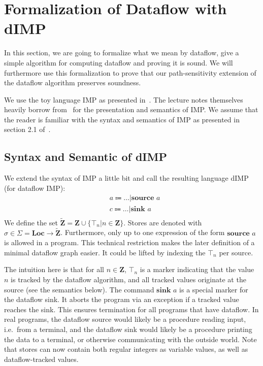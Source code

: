 \section{Formalization of Dataflow with dIMP}

In this section, we are going to formalize what we mean by dataflow,
give a simple algorithm for computing dataflow and proving it is sound.
We will furthermore use this formalization to prove that our
path-sensitivity extension of the dataflow algorithm preserves soundness.

We use the toy language IMP as presented in~\cite{sat}.
The lecture notes themselves heavily borrow from~\cite{fsopl} for the
presentation and semantics of IMP.
We assume that the reader is familiar with the syntax and semantics of IMP
as presented in section 2.1 of~\cite{sat}.

\subsection{Syntax and Semantic of dIMP}
We extend the syntax of IMP a little bit
and call the resulting language dIMP (for dataflow IMP):
\begin{align*}
    &a \Coloneqq \dots | \textbf{source } a\\
    &c \Coloneqq \dots | \textbf{sink } a\\
\end{align*}
We define the set $\tilde{\textbf{Z}} = \textbf{Z} \cup \{\top_n | n \in \textbf{Z}\}$.
Stores are denoted with $\sigma \in \Sigma = \textbf{Loc} \to \tilde{\textbf{Z}}$.
Furthermore, only up to one expression of the form $\textbf{source } a$ is allowed
in a program.
This technical restriction makes the later definition of a minimal dataflow graph
easier. It could be lifted by indexing the $\top_n$ per source.

The intuition here is that for all $n \in \textbf{Z}$, $\top_n$
is a marker indicating that the value $n$ is tracked by the dataflow algorithm,
and all tracked values originate at the source (see the semantics below).
The command $\textbf{sink } a$ is a special marker for the dataflow sink.
It aborts the program via an exception if a tracked value reaches the sink.
This ensures termination for all programs that have dataflow.
In real programs, the dataflow source would likely be a procedure reading input,
i.e.\ from a terminal, and the dataflow sink would likely be a procedure 
printing the data to a terminal, or otherwise communicating with the outside world.
Note that stores can now contain both regular integers as variable values,
as well as dataflow-tracked values.

